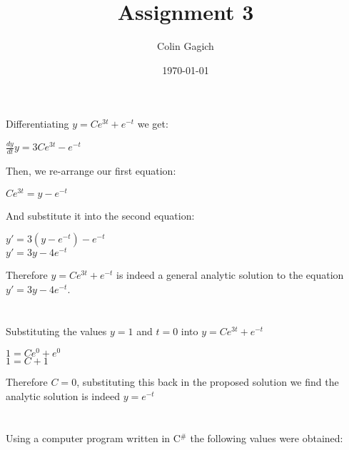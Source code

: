 \documentclass[]{article}
\title{Assignment 3}
\author{Colin Gagich}
\date{\today}
\begin{document}
\maketitle

\section{}

Differentiating $y = C e^{3t} + e^{-t}$ we get:

\begin{center}
$\frac{dy}{dt} y = 3 C e^{3t} - e^{-t}$
\end{center}

Then, we re-arrange our first equation:

\begin{center}
$C e^{3t} = y - e^{-t}$
\end{center}

And substitute it into the second equation:

\begin{center}
$y' = 3 (y - e^{-t}) - e^{-t}$ \\
$y' = 3 y - 4 e^{-t}$\\
\end{center}

\noindent Therefore $y = C e^{3t} + e^{-t}$ is indeed a general analytic solution to the equation $y' = 3 y - 4 e^{-t}$.

\section{}

Substituting the values $y = 1$ and $t = 0$ into $y = C e^{3t} + e^{-t}$

\begin{center}
$1 = C e^{0} + e^{0}$ \\
$1 = C + 1$ \\
\end{center}

\noindent Therefore $C = 0$, substituting this back in the proposed solution we find the analytic solution is indeed $y = e^{-t}$

\newpage
\section{}

Using a computer program written in C$^{\#}$ the following values were obtained:
\end{document}
